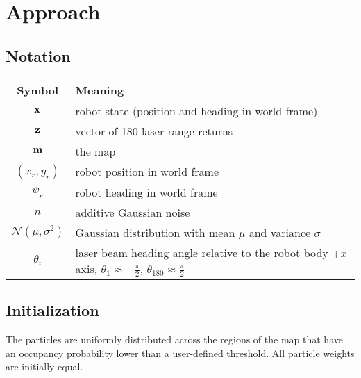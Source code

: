\section{Approach}

\subsection{Notation}

\begin{tabular}{ c p{13.5cm} }
  \textbf{Symbol} & \textbf{Meaning} \\ \hline
        $\mathbf{x}$ & robot state (position and heading in world frame) \\
        $\mathbf{z}$ & vector of 180 laser range returns \\
        $\mathbf{m}$ & the map \\
     $(x_r, y_r)$ & robot position in world frame \\
     $\psi_r$ & robot heading in world frame \\
           $n$ & additive Gaussian noise \\
 $\mathcal{N}(\mu, \sigma^2)$ & Gaussian distribution with mean $\mu$ and variance $\sigma$ \\
                   $\theta_i$ & laser beam heading angle relative to the robot body +$x$ axis, $\theta_1 \approx -\frac{\pi}{2}$, $\theta_{180} \approx \frac{\pi}{2}$
\end{tabular}

\subsection{Initialization}
The particles are uniformly distributed across the regions of the map that have an occupancy probability lower than a user-defined threshold.
All particle weights are initially equal.

